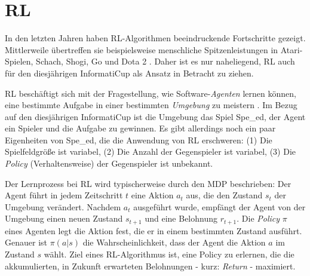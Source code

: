 \section{\acrlong{RL}}
In den letzten Jahren haben \acrshort{RL}-Algorithmen beeindruckende Fortschritte gezeigt. Mittlerweile übertreffen sie beispielsweise menschliche Spitzenleistungen in Atari-Spielen, Schach, Shogi, Go und Dota 2 \cite{Mnih.19.12.2013, Silver.2018b, OpenAI.2019}. Daher ist es nur naheliegend, \acrshort{RL} auch für den diesjährigen InformatiCup als Ansatz in Betracht zu ziehen.

\acrshort{RL} beschäftigt sich mit der Fragestellung, wie Software-\textit{Agenten} lernen können, eine bestimmte Aufgabe in einer bestimmten \textit{Umgebung} zu meistern \cite{Sutton.1998}. Im Bezug auf den diesjährigen InformatiCup ist die Umgebung das Spiel Spe\_ed, der Agent ein Spieler und die Aufgabe zu gewinnen. Es gibt allerdings noch ein paar Eigenheiten von Spe\_ed, die die Anwendung von \acrshort{RL} erschweren: (1) Die Spielfeldgröße ist variabel, (2) Die Anzahl der Gegenspieler ist variabel, (3) Die \textit{Policy} (Verhaltensweise) der Gegenspieler ist unbekannt.

Der Lernprozess bei \acrshort{RL} wird typischerweise durch den \acrfull{MDP} beschrieben: Der Agent führt in jedem Zeitschritt $t$ eine Aktion $a_t$ aus, die den Zustand $s_t$ der Umgebung verändert. Nachdem $a_t$ ausgeführt wurde, empfängt der Agent von der Umgebung einen neuen Zustand $s_{t+1}$ und eine Belohnung $r_{t+1}$. Die \textit{Policy} $\pi$ eines Agenten legt die Aktion fest, die er in einem bestimmten Zustand ausführt. Genauer ist $\pi(a|s)$ die Wahrscheinlichkeit, dass der Agent die Aktion $a$ im Zustand $s$ wählt. Ziel eines \acrshort{RL}-Algorithmus ist, eine Policy zu erlernen, die die akkumulierten, in Zukunft erwarteten Belohnungen - kurz: \textit{Return} - maximiert. \cite{Sutton.1998}


